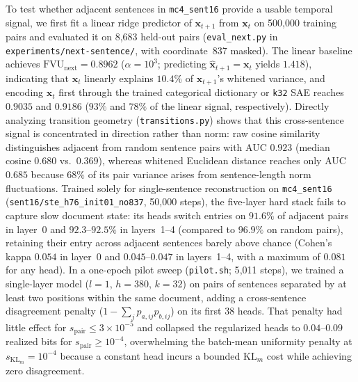 To test whether adjacent sentences in \texttt{mc4\_sent16} provide a
usable temporal signal,
we first fit a linear ridge predictor of $\mathbf{x}_{t+1}$ from
$\mathbf{x}_t$ on 500{,}000 training pairs and evaluated it on 8{,}683
held-out pairs (\texttt{eval\_next.py} in
\texttt{experiments/\allowbreak next-sentence/}, with coordinate~837
masked). The
linear baseline achieves $\mathrm{FVU}_{\mathrm{next}} = 0.8962$
($\alpha{=}10^3$; predicting $\hat{\mathbf{x}}_{t+1} = \mathbf{x}_t$
yields $1.418$), indicating that $\mathbf{x}_t$ linearly explains $10.4\%$
of $\mathbf{x}_{t+1}$'s whitened variance, and encoding $\mathbf{x}_t$
first through the trained categorical dictionary or \texttt{k32} SAE
reaches
$0.9035$ and $0.9186$ ($93\%$ and $78\%$ of the linear signal,
respectively). Directly analyzing transition geometry
(\texttt{transitions.py}) shows that this cross-sentence signal is
concentrated in direction rather than norm: raw cosine similarity
distinguishes adjacent from random sentence pairs with AUC $0.923$
(median cosine $0.680$ vs.\ $0.369$), whereas whitened Euclidean distance
reaches only AUC $0.685$ because $68\%$ of its pair variance arises from
sentence-length norm fluctuations. Trained solely for single-sentence
reconstruction on \texttt{mc4\_sent16}
(\texttt{sent16/\allowbreak ste\_h76\_init01\_no837}, 50{,}000 steps),
the five-layer hard stack fails to capture slow document state: its heads
switch entries on $91.6\%$ of adjacent pairs in layer~0 and
$92.3$--$92.5\%$ in layers~1--4 (compared to $96.9\%$ on random pairs),
retaining their entry across adjacent sentences barely above chance
(Cohen's kappa $0.054$ in layer~0 and $0.045$--$0.047$ in layers~1--4,
with a maximum of $0.081$ for any head). In a one-epoch pilot sweep
(\texttt{pilot.sh}; 5{,}011 steps), we trained a single-layer model
($l{=}1$, $h{=}380$, $k{=}32$) on pairs of sentences separated by at
least two positions within the same document, adding a cross-sentence
disagreement penalty ($1 - \sum_j p_{a,ij} p_{b,ij}$) on its first 38
heads. That penalty had little effect for $s_{\mathrm{pair}} \le
3\times10^{-5}$ and collapsed the regularized heads to $0.04$--$0.09$
realized bits for $s_{\mathrm{pair}} \ge 10^{-4}$, overwhelming the
batch-mean uniformity penalty at $s_{\mathrm{KL}_m}{=}10^{-4}$ because a
constant head incurs a bounded $\mathrm{KL}_m$ cost while achieving zero
disagreement.

